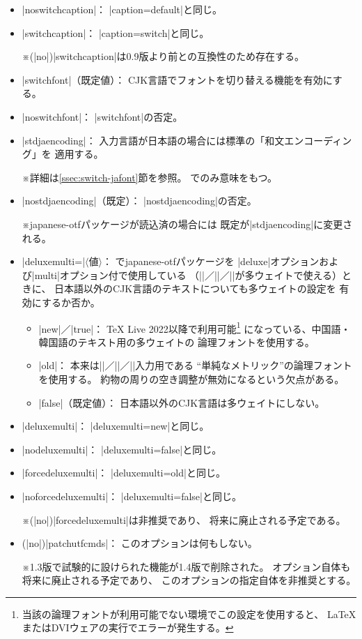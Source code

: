 \documentclass[uplatex,dvipdfmx,a4paper]{jsarticle}
\renewcommand{\headfont}{\gtfamily\romanseries{sbc}\sffamily}
\newcommand{\Pkg}[1]{\textsf{#1}}
\newcommand{\Meta}[1]{$\langle$\mbox{}#1\mbox{}$\rangle$}
\newcommand{\Note}{\par\noindent ※}
\newcommand{\Means}{：\quad\inhibitglue}
\newcommand{\XS}{\hspace{\xkanjiskip}}
\newcommand{\Strong}[1]{{\headfont#1}}
\begin{document}
\begin{itemize}
\item |noswitchcaption|\Means
|caption=default|と同じ。

\item |switchcaption|\Means
|caption=switch|と同じ。
\Note (|no|)|switchcaption|は0.9版より前との互換性のため存在する。

\item |switchfont|（既定値）\Means
CJK言語でフォントを切り替える機能を有効にする。

\item |noswitchfont|\Means
|switchfont|の否定。

\item |stdjaencoding|\Means
入力言語が日本語の場合には{\upLaTeX}標準の「和文エンコーディング」を
適用する。
\Note 詳細は\ref{ssec:switch-jafont}節を参照。
{\upLaTeX}でのみ意味をもつ。

\item |nostdjaencoding|（既定）\Means
|nostdjaencoding|の否定。
\Note \Pkg{japanese-otf}パッケージが読込済の場合には
既定が|stdjaencoding|に変更される。

\item |deluxemulti=|\Meta{値}\Means
{\upLaTeX}で\Pkg{japanese-otf}パッケージを
|deluxe|オプションおよび|multi|オプション付で使用している
（|\UTFK|／|\UTFC|／|\UTFT|が多ウェイトで使える）ときに、
日本語以外のCJK言語のテキストについても多ウェイトの設定を
有効にするか否か。
  \begin{itemize}
  \item |new|／|true|\Means
    {\TeX} Live 2022以降で利用可能\footnote{%
      当該の論理フォントが利用可能でない環境でこの設定を使用すると、
      {\LaTeX}またはDVIウェアの実行でエラーが発生する。}%
    になっている、中国語・韓国語のテキスト用の多ウェイトの
    論理フォントを使用する。
  \item |old|\Means
      本来は\XS|\UTFK|／|\UTFC|／|\UTFT|入力用である
      “単純なメトリック”の論理フォントを使用する。
      約物の周りの空き調整が無効になるという欠点がある。
  \item |false|（既定値）\Means
    日本語以外のCJK言語は多ウェイトにしない。
  \end{itemize}

\item |deluxemulti|\Means
|deluxemulti=new|と同じ。
\item |nodeluxemulti|\Means
|deluxemulti=false|と同じ。

\item |forcedeluxemulti|\Means
|deluxemulti=old|と同じ。
\item |noforcedeluxemulti|\Means
|deluxemulti=false|と同じ。
\Note (|no|)|forcedeluxemulti|は\Strong{非推奨}であり、
将来に廃止される予定である。

\item (|no|)|patchutfcmds|\Means
このオプションは何もしない。
\Note 1.3版で試験的に設けられた機能が1.4版で削除された。
オプション自体も将来に廃止される予定であり、
このオプションの指定自体を\Strong{非推奨}とする。
\end{itemize}
\end{document}
